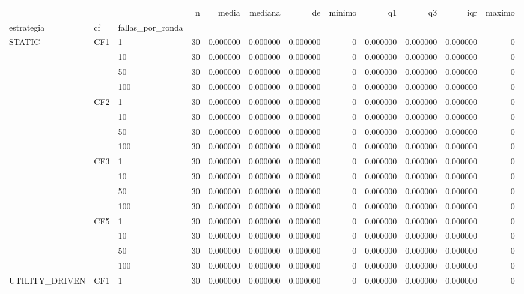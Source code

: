 \begin{tabular}{lllrrrrrrrrr}
\toprule
 &  &  & n & media & mediana & de & minimo & q1 & q3 & iqr & maximo \\
estrategia & cf & fallas_por_ronda &  &  &  &  &  &  &  &  &  \\
\midrule
\multirow[t]{16}{*}{STATIC} & \multirow[t]{4}{*}{CF1} & 1 & 30 & 0.000000 & 0.000000 & 0.000000 & 0 & 0.000000 & 0.000000 & 0.000000 & 0 \\
 &  & 10 & 30 & 0.000000 & 0.000000 & 0.000000 & 0 & 0.000000 & 0.000000 & 0.000000 & 0 \\
 &  & 50 & 30 & 0.000000 & 0.000000 & 0.000000 & 0 & 0.000000 & 0.000000 & 0.000000 & 0 \\
 &  & 100 & 30 & 0.000000 & 0.000000 & 0.000000 & 0 & 0.000000 & 0.000000 & 0.000000 & 0 \\
\cline{2-12}
 & \multirow[t]{4}{*}{CF2} & 1 & 30 & 0.000000 & 0.000000 & 0.000000 & 0 & 0.000000 & 0.000000 & 0.000000 & 0 \\
 &  & 10 & 30 & 0.000000 & 0.000000 & 0.000000 & 0 & 0.000000 & 0.000000 & 0.000000 & 0 \\
 &  & 50 & 30 & 0.000000 & 0.000000 & 0.000000 & 0 & 0.000000 & 0.000000 & 0.000000 & 0 \\
 &  & 100 & 30 & 0.000000 & 0.000000 & 0.000000 & 0 & 0.000000 & 0.000000 & 0.000000 & 0 \\
\cline{2-12}
 & \multirow[t]{4}{*}{CF3} & 1 & 30 & 0.000000 & 0.000000 & 0.000000 & 0 & 0.000000 & 0.000000 & 0.000000 & 0 \\
 &  & 10 & 30 & 0.000000 & 0.000000 & 0.000000 & 0 & 0.000000 & 0.000000 & 0.000000 & 0 \\
 &  & 50 & 30 & 0.000000 & 0.000000 & 0.000000 & 0 & 0.000000 & 0.000000 & 0.000000 & 0 \\
 &  & 100 & 30 & 0.000000 & 0.000000 & 0.000000 & 0 & 0.000000 & 0.000000 & 0.000000 & 0 \\
\cline{2-12}
 & \multirow[t]{4}{*}{CF5} & 1 & 30 & 0.000000 & 0.000000 & 0.000000 & 0 & 0.000000 & 0.000000 & 0.000000 & 0 \\
 &  & 10 & 30 & 0.000000 & 0.000000 & 0.000000 & 0 & 0.000000 & 0.000000 & 0.000000 & 0 \\
 &  & 50 & 30 & 0.000000 & 0.000000 & 0.000000 & 0 & 0.000000 & 0.000000 & 0.000000 & 0 \\
 &  & 100 & 30 & 0.000000 & 0.000000 & 0.000000 & 0 & 0.000000 & 0.000000 & 0.000000 & 0 \\
\cline{1-12} \cline{2-12}
\multirow[t]{16}{*}{UTILITY_DRIVEN} & \multirow[t]{4}{*}{CF1} & 1 & 30 & 0.000000 & 0.000000 & 0.000000 & 0 & 0.000000 & 0.000000 & 0.000000 & 0 \\

\end{tabular}
